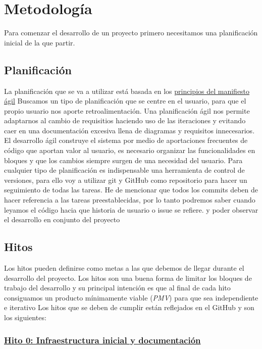 \chapter{Metodología}

Para comenzar el desarrollo de un proyecto primero necesitamos una planificación inicial de la que partir.

\section{Planificación}

La planificación que se va a utilizar está basada en los {\href{https://agilemanifesto.org/iso/es/principles.html}{principios del manifiesto ágil}}
Buscamos un tipo de planificación que se centre en el usuario, para que el propio usuario nos aporte retroalimentación.
Una planificación ágil nos permite adaptarnos al cambio de requisitios haciendo uso de las iteraciones y 
evitando caer en una documentación excesiva llena de diagramas y requisitos innecesarios.
El desarrollo ágil construye el sistema por medio de aportaciones frecuentes de código que aportan valor 
al usuario, es necesario organizar las funcionalidades en bloques y que los cambios siempre surgen de una 
necesidad del usuario.
Para cualquier tipo de planificación es indispensable una herramienta de control de versiones, para ello voy a utilizar  git
y GitHub como repositorio para hacer un seguimiento de todas las tareas.
He de mencionar que todos los commits deben de hacer referencia a las tareas preestablecidas, por lo tanto 
podremos saber cuando leyamos el código hacia que historia de usuario o issue se refiere.
y poder observar el desarrollo en conjunto del proyecto 

\section{Hitos}
Los hitos pueden definirse como metas a las que debemos de llegar durante el desarrollo del proyecto.
Los hitos son una buena forma de limitar los bloques de trabajo del desarrollo y su principal intención es que 
al final de cada hito consiguamos un producto mínimamente viable (\textit{PMV}) para que sea independiente e iterativo 
Los hitos que se deben de cumplir están reflejados en el GitHub y son los siguientes: 

\subsection*{\href{https://github.com/RubenDelgadoPareja/TFG-Triage-Inteligente-Consulta-Medica/milestone/1}{Hito 0: Infraestructura inicial y documentación}}

